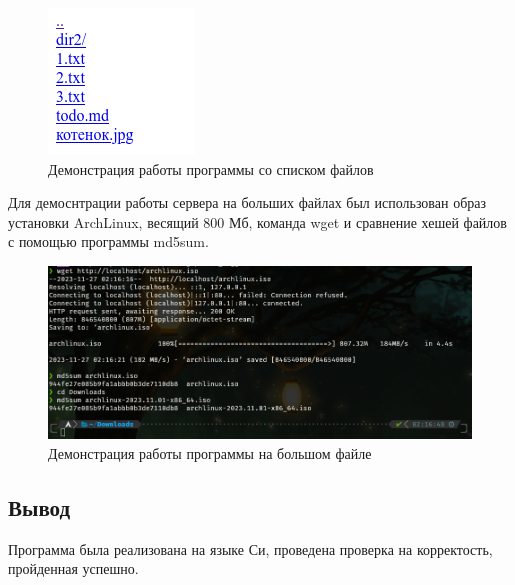 \begin{figure}[H]
    \begin{center}
        \includegraphics[width=0.25\linewidth]{inc/img/work2.png}
        \caption{Демонстрация работы программы со списком файлов}
        \label{img:work2}
    \end{center}
\end{figure}

Для демоснтрации работы сервера на больших файлах был использован образ установки ArchLinux, весящий 800 Мб, команда wget и сравнение хешей файлов с помощью программы md5sum.

\begin{figure}[H]
    \begin{center}
        \includegraphics[width=0.95\linewidth]{inc/img/mdsum.png}
        \caption{Демонстрация работы программы на большом файле}
        \label{img:work1}
    \end{center}
\end{figure}


\subsection{Вывод}

Программа была реализована на языке Си, проведена проверка на корректость, пройденная успешно.